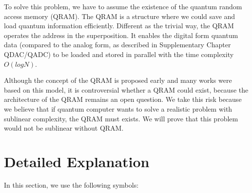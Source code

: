 \documentclass[%
 reprint,
 amsmath,amssymb,
pra,
]{revtex4-1}
\begin{document}
To solve this problem, we have to assume the existence of the quantum random access memory (QRAM). The QRAM is a structure where we could save and load quantum information efficiently. Different as the trivial way, the QRAM operates the address in the superposition. It enables the digital form quantum data (compared to the analog form, as described in Supplementary Chapter QDAC/QADC) to be loaded and stored in parallel with the time complexity $O(log N)$.

Although the concept of the QRAM is proposed early and many works were based on this model, it is controversial whether a QRAM could exist, because the architecture of the QRAM remains an open question. We take this risk because we believe that if quantum computer wants to solve a realistic problem with sublinear complexity, the QRAM must exists. We will prove that this problem would not be sublinear without QRAM.


\section{Detailed Explanation}\label{detail}
In this section, we use the following symbols:
\end{document}

